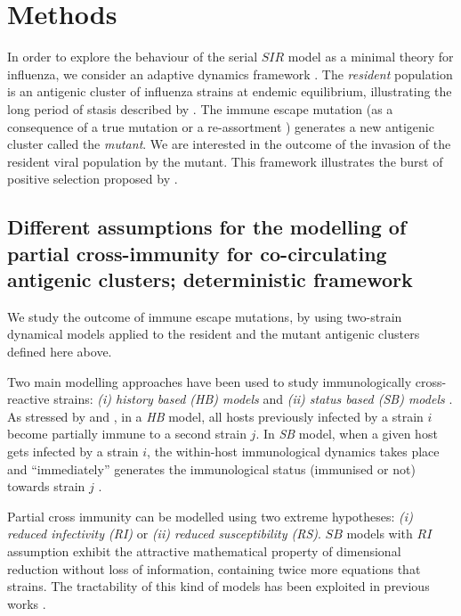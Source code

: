 \section{Methods}

In order to explore the behaviour of the serial $SIR$ model as a
minimal theory for influenza, we consider an adaptive dynamics
framework \citep{Dieckmann2002}. The \textit{resident} population is an
antigenic cluster of influenza strains at endemic equilibrium,
illustrating the long period of stasis described by \citet{Wolf2006}.
The immune escape mutation (as a consequence of a true mutation or a
re-assortment \citep{Du2008}) generates a new antigenic cluster called
the \textit{mutant}. We are interested in the outcome of the invasion
of the resident viral population by the mutant. This framework
illustrates the burst of positive selection proposed by
\citet{Wolf2006}.

\subsection{Different assumptions for the modelling of partial
  cross-immunity for co-circulating antigenic clusters; deterministic
  framework}

We study the outcome of immune escape mutations, by using two-strain
dynamical models applied to the resident and the mutant antigenic
clusters defined here above.

Two main modelling approaches have been used to study immunologically
cross-reactive strains: \textit{(i) history based (HB) models}
\citep{Andreasen1997} and \textit{(ii) status based (SB) models}
\citep{Gog2002a}. As stressed by \citet{Gog2002a} and
\citet{Kryazhimskiy2007}, in a \textit{HB} model, all hosts previously
infected by a strain $i$ become partially immune to a second strain
$j$. In \textit{SB} model, when a given host gets infected by a strain
$i$, the within-host immunological dynamics takes place and
``immediately'' generates the immunological status (immunised or not)
towards strain $j$ \citep{Gog2002a}.

Partial cross immunity can be modelled using two extreme hypotheses:
\textit{(i) reduced infectivity (RI)} or \textit{(ii) reduced
  susceptibility (RS)}. $SB$ models with $RI$ assumption exhibit the
attractive mathematical property of dimensional reduction without loss
of information, containing twice more equations that strains. The
tractability of this kind of models has been exploited in previous
works \citep{Gog2002, Koelle2006, Gog2008}.

